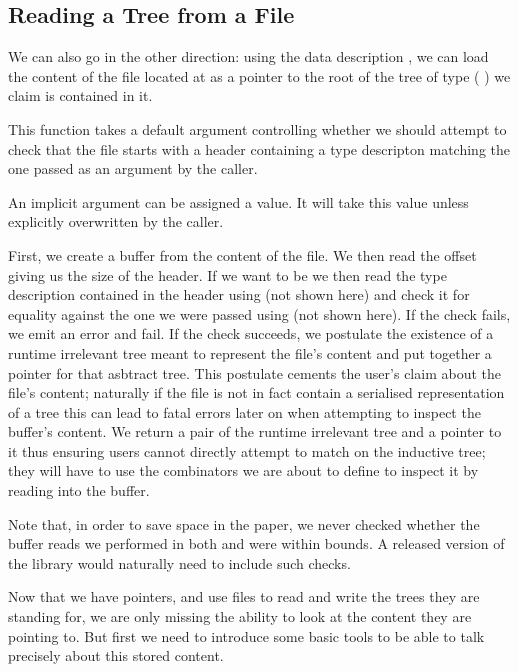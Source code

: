 \subsection{Reading a Tree from a File}

We can also go in the other direction: using the data description
, we can load the content of the file located at
 as a pointer to the root of the tree of type
( ) we claim is contained in it.


This function takes a default argument  controlling
whether we should attempt to check that the file starts with a header
containing a type descripton matching the one passed as an argument
by the caller.

\begin{remark}
  An implicit argument can be assigned a  value.
  It will take this value unless explicitly overwritten by the caller.
\end{remark}

First, we create a buffer from the content of the file.
We then read the offset giving us the size of the header.
If we want to be  we then read the type description
contained in the header using  (not shown here)
and check it for equality against the one we were passed using 
(not shown here).
%
If the check fails, we emit an error and fail.
%
If the check succeeds, we postulate the existence of a runtime irrelevant
tree meant to represent the file's content and put together a pointer
for that asbtract tree.
%
This postulate cements the user's claim about the file's content;
naturally if the file is not in fact contain a serialised representation
of a tree this can lead to fatal errors later on when attempting to
inspect the buffer's content.
%
We return a pair of the runtime irrelevant tree and a pointer to it
thus ensuring users cannot directly attempt to match on the inductive
tree; they will have to use the combinators we are about to define to
inspect it by reading into the buffer.

Note that, in order to save space in the paper, we never checked whether
the buffer reads we performed in both  and
 were within bounds.
%
A released version of the library would naturally need to include such
checks.


Now that we have pointers,
and use files to read and write the trees they are standing for,
we are only missing the ability to look at the content they are pointing to.
%
But first we need to introduce some basic tools
to be able to talk precisely about this stored content.
